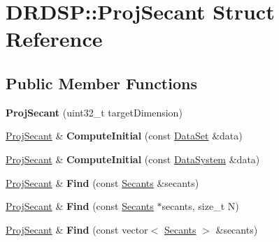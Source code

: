 \hypertarget{struct_d_r_d_s_p_1_1_proj_secant}{\section{D\-R\-D\-S\-P\-:\-:Proj\-Secant Struct Reference}
\label{struct_d_r_d_s_p_1_1_proj_secant}
}
\subsection*{Public Member Functions}
\begin{DoxyCompactItemize}
\item 
\hypertarget{struct_d_r_d_s_p_1_1_proj_secant_a6b9225aa855d0379f792542de6a9f074}{{\bfseries Proj\-Secant} (uint32\-\_\-t target\-Dimension)}\label{struct_d_r_d_s_p_1_1_proj_secant_a6b9225aa855d0379f792542de6a9f074}

\item 
\hypertarget{struct_d_r_d_s_p_1_1_proj_secant_aa55fa8720a3fc21364865b8a7939ab57}{\hyperlink{struct_d_r_d_s_p_1_1_proj_secant}{Proj\-Secant} \& {\bfseries Compute\-Initial} (const \hyperlink{struct_d_r_d_s_p_1_1_data_set}{Data\-Set} \&data)}\label{struct_d_r_d_s_p_1_1_proj_secant_aa55fa8720a3fc21364865b8a7939ab57}

\item 
\hypertarget{struct_d_r_d_s_p_1_1_proj_secant_aa6efb6dce18044a7284965904b1ac755}{\hyperlink{struct_d_r_d_s_p_1_1_proj_secant}{Proj\-Secant} \& {\bfseries Compute\-Initial} (const \hyperlink{struct_d_r_d_s_p_1_1_data_system}{Data\-System} \&data)}\label{struct_d_r_d_s_p_1_1_proj_secant_aa6efb6dce18044a7284965904b1ac755}

\item 
\hypertarget{struct_d_r_d_s_p_1_1_proj_secant_a1b4b5d140093eab8a0313a035ad35f7a}{\hyperlink{struct_d_r_d_s_p_1_1_proj_secant}{Proj\-Secant} \& {\bfseries Find} (const \hyperlink{struct_d_r_d_s_p_1_1_secants}{Secants} \&secants)}\label{struct_d_r_d_s_p_1_1_proj_secant_a1b4b5d140093eab8a0313a035ad35f7a}

\item 
\hypertarget{struct_d_r_d_s_p_1_1_proj_secant_ad6422b7edf25dec73c435bbbc83179d2}{\hyperlink{struct_d_r_d_s_p_1_1_proj_secant}{Proj\-Secant} \& {\bfseries Find} (const \hyperlink{struct_d_r_d_s_p_1_1_secants}{Secants} $\ast$secants, size\-\_\-t N)}\label{struct_d_r_d_s_p_1_1_proj_secant_ad6422b7edf25dec73c435bbbc83179d2}

\item 
\hypertarget{struct_d_r_d_s_p_1_1_proj_secant_af6176307efdb61f11ba39aa8bd155322}{\hyperlink{struct_d_r_d_s_p_1_1_proj_secant}{Proj\-Secant} \& {\bfseries Find} (const vector$<$ \hyperlink{struct_d_r_d_s_p_1_1_secants}{Secants} $>$ \&secants)}\label{struct_d_r_d_s_p_1_1_proj_secant_af6176307efdb61f11ba39aa8bd155322}


\end{DoxyCompactItemize}
